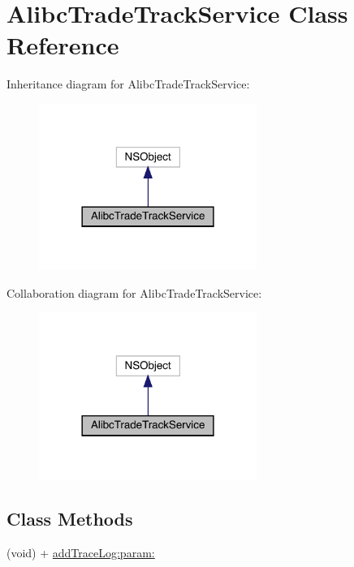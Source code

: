 \hypertarget{interface_alibc_trade_track_service}{}\section{Alibc\+Trade\+Track\+Service Class Reference}
\label{interface_alibc_trade_track_service}


Inheritance diagram for Alibc\+Trade\+Track\+Service\+:\nopagebreak
\begin{figure}[H]
\begin{center}
\leavevmode
\includegraphics[width=201pt]{interface_alibc_trade_track_service__inherit__graph}
\end{center}
\end{figure}


Collaboration diagram for Alibc\+Trade\+Track\+Service\+:\nopagebreak
\begin{figure}[H]
\begin{center}
\leavevmode
\includegraphics[width=201pt]{interface_alibc_trade_track_service__coll__graph}
\end{center}
\end{figure}
\subsection*{Class Methods}
\begin{DoxyCompactItemize}
\item 
(void) + \mbox{\hyperlink{interface_alibc_trade_track_service_aa9fd4e0e300758f2e38ed2129a3860a8}{add\+Trace\+Log\+:param\+:}}
\end{DoxyCompactItemize}


